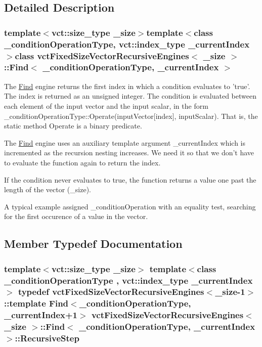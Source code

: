 \subsection{Detailed Description}
\subsubsection*{template$<$vct\-::size\-\_\-type \-\_\-size$>$template$<$class \-\_\-condition\-Operation\-Type, vct\-::index\-\_\-type \-\_\-current\-Index$>$class vct\-Fixed\-Size\-Vector\-Recursive\-Engines$<$ \-\_\-size $>$\-::\-Find$<$ \-\_\-condition\-Operation\-Type, \-\_\-current\-Index $>$}

The \hyperlink{classvct_fixed_size_vector_recursive_engines_1_1_find}{Find} engine returns the first index in which a condition evaluates to 'true'. The index is returned as an unsigned integer. The condition is evaluated between each element of the input vector and the input scalar, in the form {\ttfamily  \-\_\-condition\-Operation\-Type\-::\-Operate(input\-Vector\mbox{[}index\mbox{]}, input\-Scalar)}. That is, the static method Operate is a binary predicate.

The \hyperlink{classvct_fixed_size_vector_recursive_engines_1_1_find}{Find} engine uses an auxiliary template argument {\ttfamily \-\_\-current\-Index} which is incremented as the recursion nesting increases. We need it so that we don't have to evaluate the function again to return the index.

If the condition never evaluates to true, the function returns a value one past the length of the vector ({\ttfamily \-\_\-size}).

A typical example assigned {\ttfamily \-\_\-condition\-Operation} with an equality test, searching for the first occurence of a value in the vector. 

\subsection{Member Typedef Documentation}
\hypertarget{classvct_fixed_size_vector_recursive_engines_1_1_find_aae2588d04bd3f2f1cd9daff01c63f334}{
\subsubsection[{Recursive\-Step}]{\setlength{\rightskip}{0pt plus 5cm}template$<$vct\-::size\-\_\-type \-\_\-size$>$ template$<$class \-\_\-condition\-Operation\-Type , vct\-::index\-\_\-type \-\_\-current\-Index$>$ typedef {\bf vct\-Fixed\-Size\-Vector\-Recursive\-Engines}$<$\-\_\-size-\/1$>$\-::template {\bf Find}$<$\-\_\-condition\-Operation\-Type, \-\_\-current\-Index+1$>$ {\bf vct\-Fixed\-Size\-Vector\-Recursive\-Engines}$<$ \-\_\-size $>$\-::{\bf Find}$<$ \-\_\-condition\-Operation\-Type, \-\_\-current\-Index $>$\-::{\bf Recursive\-Step}}}\label{classvct_fixed_size_vector_recursive_engines_1_1_find_aae2588d04bd3f2f1cd9daff01c63f334}


